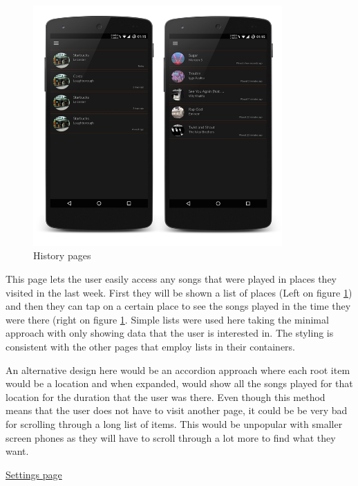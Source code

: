 \noindent
\begin{figure}[h!]
\centering
\includegraphics[width=0.85\textwidth]{./img/historyboth.png}
\caption{History pages}
\label{fig:historyboth}
\end{figure}

This page lets the user easily access any songs that were played in places they visited in the last week. First they will be shown a list of places (Left on figure \ref{fig:historyboth}) and then they can tap on a certain place to see the songs played in the time they were there (right on figure \ref{fig:historyboth}. Simple lists were used here taking the minimal approach with only showing data that the user is interested in. The styling is consistent with the other pages that employ lists in their containers.

An alternative design here would be an accordion approach where each root item would be a location and when expanded, would show all the songs played for that location for the duration that the user was there. Even though this method means that the user does not have to visit another page, it could be be very bad for scrolling through a long list of items. This would be unpopular with smaller screen phones as they will have to scroll through a lot more to find what they want.

\newpage

\noindent\underline{Settings page}\newline

